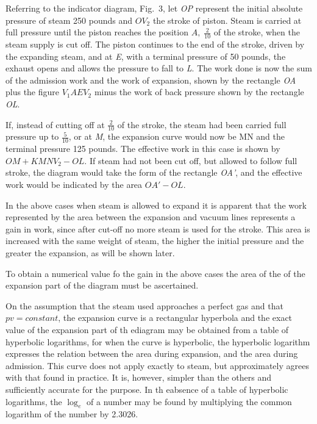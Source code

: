 \documentclass[11pt, a5paper]{book}
\begin{document}
Referring to the indicator diagram, Fig.\ 3, let \textit{OP} represent
the initial absolute pressure of steam 250 pounds and $OV_2$ the
stroke of piston.  Steam is carried at full pressure until the piston
reaches the position $A,\; \frac{2}{10}$ of the stroke, when the steam
supply is cut off.  The piston continues to the end of the stroke,
driven by the expanding steam, and at \textit{E}, with a terminal
pressure of 50 pounds, the exhaust opens and allows the pressure to
fall to \textit{L}.  The work done is now the sum of the admission
work and the work of expansion, shown by the rectangle \textit{OA}
plus the figure $V_1 AEV_2$ minus the work of back pressure shown by
the rectangle \textit{OL}.\par

If, instead of cutting off at $\frac{2}{10}$ of the stroke, the steam
had been carried full pressure up to $\frac{5}{10}$, or at \textit{M},
the expansion curve would now be MN and the terminal pressure 125
pounds.  The effective work in this case is shown by $OM + KMNV_2 -
OL$.  If steam had not been cut off, but allowed to follow full
stroke, the diagram would take the form of the rectangle \textit{OA'},
and the effective work would be indicated by the area $OA' - OL$.\par

In the above cases when steam is allowed to expand it is apparent that
the work represented by the area between the expansion and vacuum
lines represents a gain in work, since after cut-off no more steam is
used for the stroke.  This area is increased with the same weight of
steam, the higher the initial pressure and the greater the expansion,
as will be shown later.\par

To obtain a numerical value fo the gain in the above cases the area of
the of the expansion part of the diagram must be ascertained.\par

On the assumption that the steam used approaches a perfect gas and
that $pv = constant$, the expansion curve is a rectangular hyperbola
and the exact value of the expansion part of th ediagram may be
obtained from a table of hyperbolic logarithms, for when the curve is
hyperbolic, the hyperbolic logarithm expresses the relation between
the area during expansion, and the area during admission.  This curve
does not apply exactly to steam, but approximately agrees with that
found in practice.  It is, however, simpler than the others and
sufficiently accurate for the purpose.  In th eabsence of a table of
hyperbolic logarithms, the $\log_e$ of a number may be found by
multiplying the common logarithm of the number by 2.3026.\par
\end{document}
